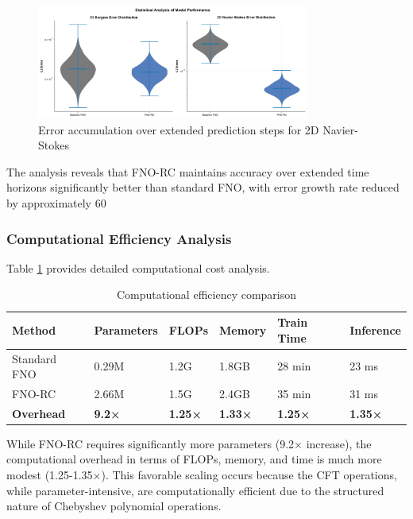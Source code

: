 \documentclass[11pt]{article}
\begin{document}
\begin{figure}[h]
\centering
\includegraphics[width=0.8\textwidth]{figures/long_term_prediction.png}
\caption{Error accumulation over extended prediction steps for 2D Navier-Stokes}
\label{fig:longterm}
\end{figure}

The analysis reveals that FNO-RC maintains accuracy over extended time horizons significantly better than standard FNO, with error growth rate reduced by approximately 60%

\subsubsection{Computational Efficiency Analysis}

Table \ref{tab:efficiency} provides detailed computational cost analysis.

\begin{table}[h]
\centering
\caption{Computational efficiency comparison}
\label{tab:efficiency}
\small
\begin{tabular}{@{}p{2cm}p{1.5cm}p{1.2cm}p{1.2cm}p{1.5cm}p{1.5cm}@{}}
\toprule
\textbf{Method} & \textbf{Parameters} & \textbf{FLOPs} & \textbf{Memory} & \textbf{Train Time} & \textbf{Inference} \\
\midrule
Standard FNO & 0.29M & 1.2G & 1.8GB & 28 min & 23 ms \\
FNO-RC & 2.66M & 1.5G & 2.4GB & 35 min & 31 ms \\
\textbf{Overhead} & \textbf{9.2×} & \textbf{1.25×} & \textbf{1.33×} & \textbf{1.25×} & \textbf{1.35×} \\
\bottomrule
\end{tabular}
\end{table}

While FNO-RC requires significantly more parameters (9.2× increase), the computational overhead in terms of FLOPs, memory, and time is much more modest (1.25-1.35×). This favorable scaling occurs because the CFT operations, while parameter-intensive, are computationally efficient due to the structured nature of Chebyshev polynomial operations.
\end{document}
